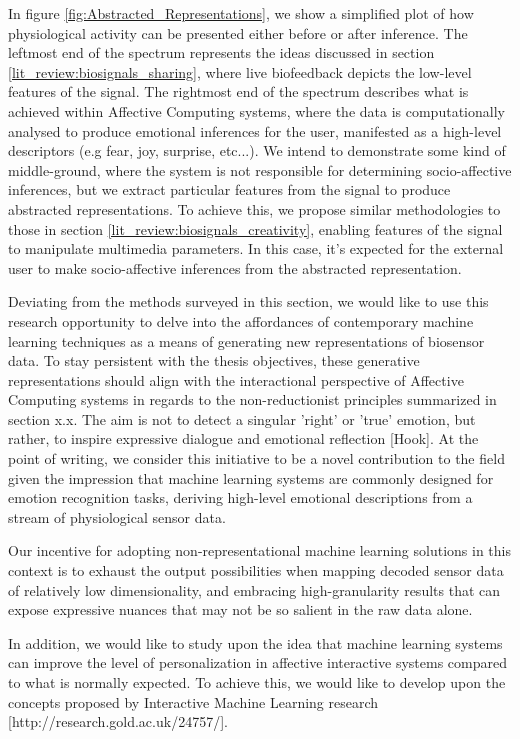 In figure \ref{fig:Abstracted_Representations}, we show a simplified plot of how physiological activity can be presented either before or after inference. The leftmost end of the spectrum represents the ideas discussed in section \ref{lit_review:biosignals_sharing}, where live biofeedback depicts the low-level features of the signal. The rightmost end of the spectrum describes what is achieved within Affective Computing systems, where the data is computationally analysed to produce emotional inferences for the user, manifested as a high-level descriptors (e.g fear, joy, surprise, etc...). We intend to demonstrate some kind of middle-ground, where the system is not responsible for determining socio-affective inferences, but we extract particular features from the signal to produce abstracted representations. To achieve this, we propose similar methodologies to those in section \ref{lit_review:biosignals_creativity}, enabling features of the signal to manipulate multimedia parameters. In this case, it's expected for the external user to make socio-affective inferences from the abstracted representation.

Deviating from the methods surveyed in this section, we would like to use this research opportunity to delve into the affordances of contemporary machine learning techniques as a means of generating new representations of biosensor data.  To stay persistent with the thesis objectives, these generative representations should align with the interactional perspective of Affective Computing systems in regards to the non-reductionist principles summarized in section x.x. The aim is not to detect a singular 'right' or 'true' emotion, but rather, to inspire expressive dialogue and emotional reflection [Hook]. At the point of writing, we consider this initiative to be a novel contribution to the field given the impression that machine learning systems are commonly designed for emotion recognition tasks, deriving high-level emotional descriptions from a stream of physiological sensor data.

Our incentive for adopting non-representational machine learning solutions in this context is to exhaust the output possibilities when mapping decoded sensor data of relatively low dimensionality, and embracing high-granularity results that can expose expressive nuances that may not be so salient in the raw data alone.

In addition, we would like to study upon the idea that machine learning systems can improve the level of personalization in affective interactive systems compared to what is normally expected. To achieve this, we would like to develop upon the concepts proposed by Interactive Machine Learning research [http://research.gold.ac.uk/24757/].




